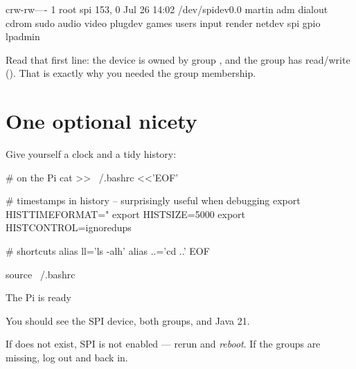 \begin{trace}
crw-rw---- 1 root spi 153, 0 Jul 26 14:02 /dev/spidev0.0
martin adm dialout cdrom sudo audio video plugdev games users input
       render netdev spi gpio lpadmin
\end{trace}

Read that first line: the device is owned by group , and the group has
read/write (). That is exactly why you needed the group membership.

\section{One optional nicety}

Give yourself a clock and a tidy history:

\begin{shell}
# on the Pi
cat >> ~/.bashrc <<'EOF'

# timestamps in history -- surprisingly useful when debugging
export HISTTIMEFORMAT="%
export HISTSIZE=5000
export HISTCONTROL=ignoredups

# shortcuts
alias ll='ls -alh'
alias ..='cd ..'
EOF

source ~/.bashrc
\end{shell}

\begin{checkpoint}{The Pi is ready}

You should see the SPI device, both groups, and Java 21.

If  does not exist, SPI is not enabled --- rerun
 and \emph{reboot}. If the groups are missing, log out and
back in.
\end{checkpoint}
